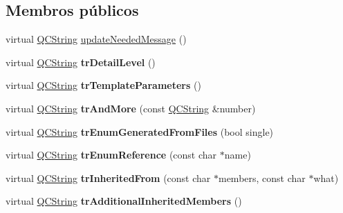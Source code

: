 \subsection*{Membros públicos}
\begin{DoxyCompactItemize}
\item 
virtual \hyperlink{class_q_c_string}{Q\-C\-String} \hyperlink{class_translator_adapter__1__8__0_aa2c053398a494e36caf5152d9a4fc6cf}{update\-Needed\-Message} ()
\item 
\hypertarget{class_translator_adapter__1__8__0_a138b581235bf64a0338ed25ee0d1ad61}{virtual \hyperlink{class_q_c_string}{Q\-C\-String} {\bfseries tr\-Detail\-Level} ()}\label{class_translator_adapter__1__8__0_a138b581235bf64a0338ed25ee0d1ad61}

\item 
\hypertarget{class_translator_adapter__1__8__0_ad9599164391093757c91bbe746f694a5}{virtual \hyperlink{class_q_c_string}{Q\-C\-String} {\bfseries tr\-Template\-Parameters} ()}\label{class_translator_adapter__1__8__0_ad9599164391093757c91bbe746f694a5}

\item 
\hypertarget{class_translator_adapter__1__8__0_a391327398836ee03f1d00415b80cb997}{virtual \hyperlink{class_q_c_string}{Q\-C\-String} {\bfseries tr\-And\-More} (const \hyperlink{class_q_c_string}{Q\-C\-String} \&number)}\label{class_translator_adapter__1__8__0_a391327398836ee03f1d00415b80cb997}

\item 
\hypertarget{class_translator_adapter__1__8__0_a2039b9a9624800366462f980e8ebce70}{virtual \hyperlink{class_q_c_string}{Q\-C\-String} {\bfseries tr\-Enum\-Generated\-From\-Files} (bool single)}\label{class_translator_adapter__1__8__0_a2039b9a9624800366462f980e8ebce70}

\item 
\hypertarget{class_translator_adapter__1__8__0_a0209ef4cc7768fc9abf62f7ffc95534e}{virtual \hyperlink{class_q_c_string}{Q\-C\-String} {\bfseries tr\-Enum\-Reference} (const char $\ast$name)}\label{class_translator_adapter__1__8__0_a0209ef4cc7768fc9abf62f7ffc95534e}

\item 
\hypertarget{class_translator_adapter__1__8__0_af8b8b1bb56a7ea74b11dad76e644968e}{virtual \hyperlink{class_q_c_string}{Q\-C\-String} {\bfseries tr\-Inherited\-From} (const char $\ast$members, const char $\ast$what)}\label{class_translator_adapter__1__8__0_af8b8b1bb56a7ea74b11dad76e644968e}

\item 
\hypertarget{class_translator_adapter__1__8__0_a62da1a83afa60109108fba6ad327a06f}{virtual \hyperlink{class_q_c_string}{Q\-C\-String} {\bfseries tr\-Additional\-Inherited\-Members} ()}\label{class_translator_adapter__1__8__0_a62da1a83afa60109108fba6ad327a06f}

\end{DoxyCompactItemize}
